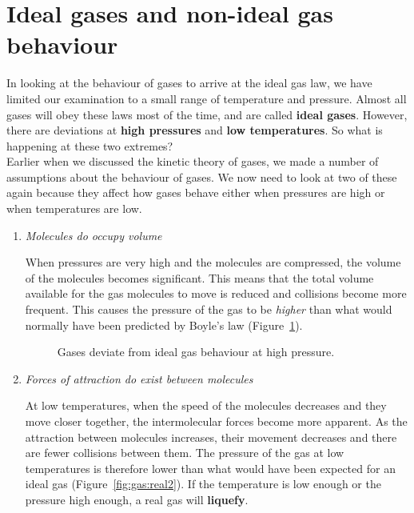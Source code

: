 
\section{Ideal gases and non-ideal gas behaviour}
\label{sec:gases:ideal}

In looking at the behaviour of gases to arrive at the ideal gas law, we have limited our examination to a small range of temperature and pressure. Almost all gases will obey these laws most of the time, and are called \textbf{ideal gases}. However, there are deviations at \textbf{high pressures} and \textbf{low temperatures}. So what is happening at these two extremes? \\

Earlier when we discussed the kinetic theory of gases, we made a number of assumptions about the behaviour of gases. We now need to look at two of these again because they affect how gases behave either when pressures are high or when temperatures are low.

\begin{enumerate}
\item{\textit{Molecules do occupy volume}}

When pressures are very high and the molecules are compressed, the volume of the molecules becomes significant. This means that the total volume available for the gas molecules to move is reduced and collisions become more frequent. This causes the pressure of the gas to be \textit{higher} than what would normally have been predicted by Boyle's law (Figure~\ref{fig:gas:real1}).

\begin{figure}[H]
\begin{center}
\end{center}
\caption{Gases deviate from ideal gas behaviour at high pressure.}
\label{fig:gas:real1}
\end{figure}


\item{\textit{Forces of attraction do exist between molecules}}

At low temperatures, when the speed of the molecules decreases and they move closer together, the intermolecular forces become more apparent. As the attraction between molecules increases, their movement decreases and there are fewer collisions between them. The pressure of the gas at low temperatures is therefore lower than what would have been expected for an ideal gas (Figure~\ref{fig:gas:real2}). If the temperature is low enough or the pressure high enough, a real gas will \textbf{liquefy}.
\end{enumerate}

